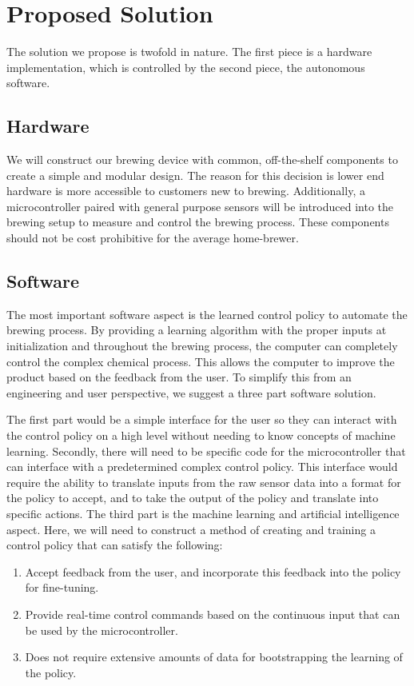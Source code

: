 \documentclass[letterpaper,10pt]{article}
\begin{document}
\section{Proposed Solution}
The solution we propose is twofold in nature.
The first piece is a hardware implementation, which is controlled by the second piece, 
the autonomous software.

\subsection{Hardware}
We will construct our brewing device with common, off-the-shelf components
to create a simple and modular design. The reason for this decision is 
lower end hardware is more accessible to customers new to brewing.
Additionally, a microcontroller paired with general purpose sensors will be 
introduced into the brewing setup to measure and control the brewing process.
These components should not be cost prohibitive for the average home-brewer.

\subsection{Software}
The most important software aspect is the learned control policy 
to automate the brewing process. By providing a learning algorithm with the proper 
inputs at initialization and throughout the brewing process, the computer can completely 
control the complex chemical process. This allows the computer to improve the product 
based on the feedback from the user. To simplify this from an engineering and user 
perspective, we suggest a three part software solution.

The first part would be a simple interface for the user so they can 
interact with the control policy on a high level without needing to know concepts of 
machine learning. Secondly, there will need to be specific code for the microcontroller 
that can interface with a predetermined complex control policy. This interface would 
require the ability to translate inputs from the raw sensor data into a format for 
the policy to accept, and to take the  output of the policy and translate into specific 
actions. The third part is the machine learning and artificial intelligence aspect.
Here, we will need to construct a method of creating and training a control policy 
that can satisfy the following:

\begin{enumerate}
	\item Accept feedback from the user, and incorporate this feedback into the 
		policy for fine-tuning.
	\item Provide real-time control commands based on the continuous input that 
		can be used by the microcontroller.
	\item Does not require extensive amounts of data for bootstrapping the learning 
		of the policy.
\end{enumerate}
\end{document}
